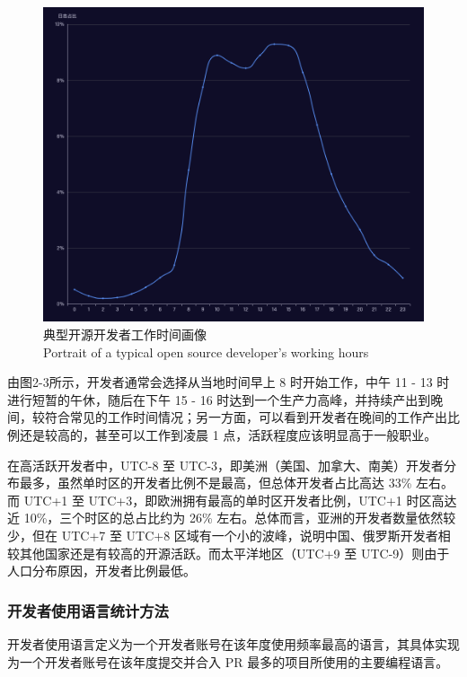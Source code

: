 \begin{figure}[H]
    \centering
    \includegraphics[width=130mm]{./figures/image2-3.png}
    \caption{ 典型开源开发者工作时间画像\\Portrait of a typical open source developer's working hours}
\end{figure}

\par 由图2-3所示，开发者通常会选择从当地时间早上 8 时开始工作，中午 11 - 13 时进行短暂的午休，随后在下午 15 - 16 时达到一个生产力高峰，并持续产出到晚间，较符合常见的工作时间情况；另一方面，可以看到开发者在晚间的工作产出比例还是较高的，甚至可以工作到凌晨 1 点，活跃程度应该明显高于一般职业。

\par 在高活跃开发者中，UTC-8 至 UTC-3，即美洲（美国、加拿大、南美）开发者分布最多，虽然单时区的开发者比例不是最高，但总体开发者占比高达 33\% 左右。而 UTC+1 至 UTC+3，即欧洲拥有最高的单时区开发者比例，UTC+1 时区高达近 10\%，三个时区的总占比约为 26\% 左右。总体而言，亚洲的开发者数量依然较少，但在 UTC+7 至 UTC+8 区域有一个小的波峰，说明中国、俄罗斯开发者相较其他国家还是有较高的开源活跃。而太平洋地区（UTC+9 至 UTC-9）则由于人口分布原因，开发者比例最低。


\subsubsection{开发者使用语言统计方法}
\par 开发者使用语言定义为一个开发者账号在该年度使用频率最高的语言，其具体实现为一个开发者账号在该年度提交并合入 PR 最多的项目所使用的主要编程语言。


